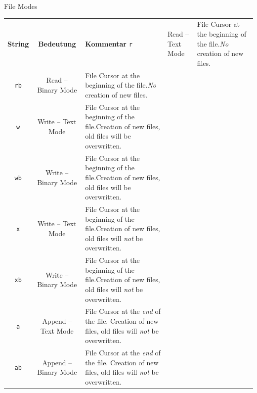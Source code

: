\begin{frame}[fragile]{File Modes}
%
\begin{center}
\scriptsize
{}
\begin{tabular}{c|cp{.6\linewidth}}
	\toprule
	\textbf{String}	& \textbf{Bedeutung}       & \textbf{Kommentar} \tabcrlf
	\texttt{r}				& Read   -- Text Mode      & File Cursor at the beginning of the file.\newline \emph{No} creation of new files.\\
	\texttt{rb}			& Read   -- Binary Mode    & File Cursor at the beginning of the file.\newline \emph{No} creation of new files.\\
	\texttt{w}				& Write  -- Text Mode      & File Cursor at the beginning of the file.\newline Creation of new files, old files will be overwritten.\\
	\texttt{wb}			& Write  -- Binary Mode    & File Cursor at the beginning of the file.\newline Creation of new files, old files will be overwritten.\\
	\texttt{x}				& Write  -- Text Mode      & File Cursor at the beginning of the file.\newline Creation of new files, old files will \emph{not} be overwritten.\\
	\texttt{xb}			& Write  -- Binary Mode    & File Cursor at the beginning of the file.\newline Creation of new files, old files will \emph{not} be overwritten.\\
	\texttt{a}				& Append -- Text Mode      & File Cursor at the \emph{end} of the file. Creation of new files, old files will \emph{not} be overwritten.\\
	\texttt{ab}			& Append -- Binary Mode    & File Cursor at the \emph{end} of the file. Creation of new files, old files will \emph{not} be overwritten. \\
	\bottomrule
\end{tabular}
\end{center}
%
\end{frame}


